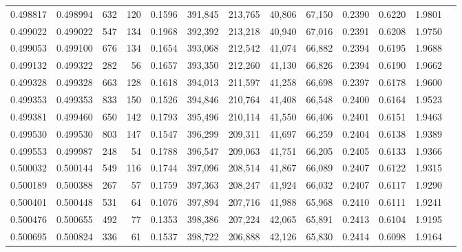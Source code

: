 \begin{tabular}{rrrrrrrrrrrrr}
0.498817 & 0.498994 &   632 &   120 &                                     0.1596 & 391,845 & 213,765 &  40,806 &  67,150 & 0.2390 & 0.6220 & 1.9801 \\
0.499022 & 0.499022 &   547 &   134 &                                     0.1968 & 392,392 & 213,218 &  40,940 &  67,016 & 0.2391 & 0.6208 & 1.9750 \\
0.499053 & 0.499100 &   676 &   134 &                                     0.1654 & 393,068 & 212,542 &  41,074 &  66,882 & 0.2394 & 0.6195 & 1.9688 \\
0.499132 & 0.499322 &   282 &    56 &                                     0.1657 & 393,350 & 212,260 &  41,130 &  66,826 & 0.2394 & 0.6190 & 1.9662 \\
0.499328 & 0.499328 &   663 &   128 &                                     0.1618 & 394,013 & 211,597 &  41,258 &  66,698 & 0.2397 & 0.6178 & 1.9600 \\
0.499353 & 0.499353 &   833 &   150 &                                     0.1526 & 394,846 & 210,764 &  41,408 &  66,548 & 0.2400 & 0.6164 & 1.9523 \\
0.499381 & 0.499460 &   650 &   142 &                                     0.1793 & 395,496 & 210,114 &  41,550 &  66,406 & 0.2401 & 0.6151 & 1.9463 \\
0.499530 & 0.499530 &   803 &   147 &                                     0.1547 & 396,299 & 209,311 &  41,697 &  66,259 & 0.2404 & 0.6138 & 1.9389 \\
0.499553 & 0.499987 &   248 &    54 &                                     0.1788 & 396,547 & 209,063 &  41,751 &  66,205 & 0.2405 & 0.6133 & 1.9366 \\
0.500032 & 0.500144 &   549 &   116 &                                     0.1744 & 397,096 & 208,514 &  41,867 &  66,089 & 0.2407 & 0.6122 & 1.9315 \\
0.500189 & 0.500388 &   267 &    57 &                                     0.1759 & 397,363 & 208,247 &  41,924 &  66,032 & 0.2407 & 0.6117 & 1.9290 \\
0.500401 & 0.500448 &   531 &    64 &                                     0.1076 & 397,894 & 207,716 &  41,988 &  65,968 & 0.2410 & 0.6111 & 1.9241 \\
0.500476 & 0.500655 &   492 &    77 &                                     0.1353 & 398,386 & 207,224 &  42,065 &  65,891 & 0.2413 & 0.6104 & 1.9195 \\
0.500695 & 0.500824 &   336 &    61 &                                     0.1537 & 398,722 & 206,888 &  42,126 &  65,830 & 0.2414 & 0.6098 & 1.9164 \\

\end{tabular}
